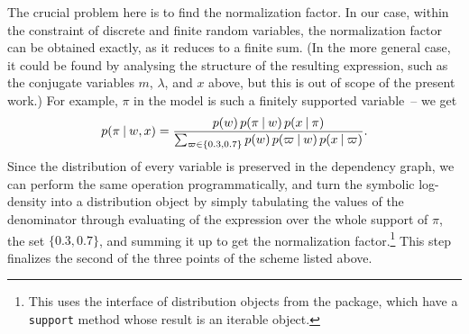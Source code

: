 The crucial problem here is to find the normalization factor.  In our case, within the constraint of
discrete and finite random variables, the normalization factor can be obtained exactly, as it
reduces to a finite sum.  (In the more general case, it could be found by analysing the structure of
the resulting expression, such as the conjugate variables \(m\), \(\lambda\), and \(x\) above, but
this is out of scope of the present work.)  For example, \(\pi\) in the 
model is such a finitely supported variable~-- we get
\begin{equation}
    p(\pi \:\vert\: w, x) = \frac{p(w) \, p(\pi \:\vert\: w) \, p(x \:\vert\: \pi)}{
      \sum_{\varpi \in \{0.3, 0.7\}}p(w) \, p(\varpi \:\vert\: w) \, p(x \:\vert\: \varpi)}.
\end{equation}
Since the distribution of every variable is preserved in the dependency graph, we can perform the
same operation programmatically, and turn the symbolic log-density into a distribution object by
simply tabulating the values of the denominator through evaluating of the expression over the whole
support of \(\pi\), the set \(\{0.3, 0.7\}\), and summing it up to get the normalization
factor.\footnote{This uses the interface of distribution objects from the
   package, which have a \texttt{support} method whose result is an
  iterable object.}  This step finalizes the second of the three points of the scheme listed above.

